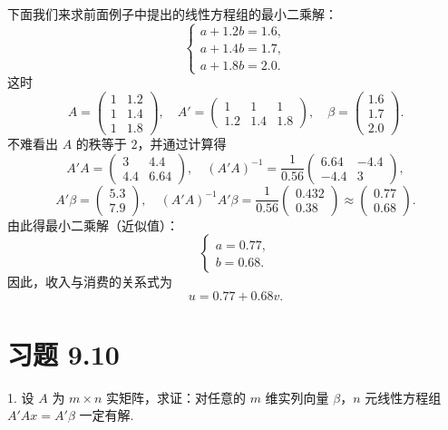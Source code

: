 \documentclass[UTF8, 12pt, fontset=fandol, oneside]{ctexart}
\begin{document}
下面我们来求前面例子中提出的线性方程组的最小二乘解：
\[
  \begin{cases}
    a+1.2b=1.6,\\
    a+1.4b=1.7,\\
    a+1.8b=2.0.
  \end{cases}
\]
这时
\[
  A=
  \left(\begin{array}{cc}
    1 & 1.2\\
    1 & 1.4\\
    1 & 1.8
  \end{array}\right),\quad
  A'=
  \left(\begin{array}{ccc}
    1 & 1 & 1\\
    1.2 & 1.4 & 1.8
  \end{array}\right),\quad
  \beta=
  \left(\begin{array}{c}
    1.6\\ 1.7\\ 2.0
  \end{array}\right).
\]
不难看出 $A$ 的秩等于 $2$，并通过计算得
\[
  A'A=
  \left(\begin{array}{cc}
    3 & 4.4\\
    4.4 & 6.64
  \end{array}\right),\quad
  (A'A)^{-1}=\frac1{0.56}
  \left(\begin{array}{rr}
    6.64 & -4.4\\
    -4.4 & 3
  \end{array}\right),
\]
\[
  A'\beta=
  \left(\begin{array}{c}
    5.3\\
    7.9
  \end{array}\right),\quad
  (A'A)^{-1}A'\beta=\frac1{0.56}
  \left(\begin{array}{c}
    0.432\\
    0.38
  \end{array}\right)
  \approx
  \left(\begin{array}{c}
    0.77\\
    0.68
  \end{array}\right).
\]
由此得最小二乘解（近似值）：
\[
  \begin{cases}
    a=0.77,\\
    b=0.68.
  \end{cases}
\]
因此，收入与消费的关系式为
\[
  u=0.77+0.68v.
\]

\section*{习题 9.10}

1. 设 $A$ 为 $m\times n$ 实矩阵，求证：对任意的 $m$ 维实列向量 $\beta$，$n$ 元线性方程组 $A'Ax=A'\beta$ 一定有解.
\end{document}
